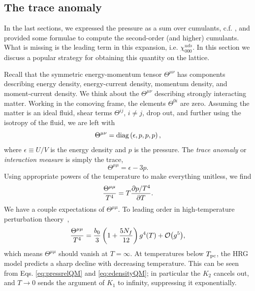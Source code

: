 \subsection{The trace anomaly}

In the last sections, we expressed the pressure as a sum over cumulants,
c.f. , and provided some formulae to compute the second-order 
(and higher) cumulants. What is missing is the leading term in this expansion,
i.e. $\chi^{uds}_{000}$. In this section we discuss a popular strategy for
obtaining this quantity on the lattice.

Recall that the symmetric energy-momentum 
tensor $\Theta^{\mu\nu}$ has components describing
energy density, energy-current density, momentum density, and moment-current
density. We think about the $\Theta^{\mu\nu}$ describing strongly interacting matter.
Working in the comoving frame, the elements $\Theta^{0i}$ are zero.
Assuming the matter is an ideal fluid, shear terms $\Theta^{ij}$, $i\neq j$, drop
out, and further using the isotropy of the fluid, we are left with 
\begin{equation}
\Theta^{\mu\nu}=\mathop{\mathrm{diag}}\left(\epsilon,p,p,p\right),
\end{equation}
where $\epsilon\equiv U/V$ is the energy density and $p$ is the pressure. 
The {\it trace anomaly} or {\it interaction
measure} is simply the trace,
\begin{equation}
\Theta^{\mu\mu}=\epsilon-3p.
\end{equation}
Using appropriate powers of the temperature to make everything unitless, we find
\begin{equation}\label{eq:thetaPressureDE}
\frac{\Theta^{\mu\mu}}{T^4}=T\pdv{p/T^4}{T}.
\end{equation}
We have a couple expectations of $\Theta^{\mu\mu}$. To leading order in
high-temperature perturbation theory~\cite{Kapusta:1979fh},
\begin{equation}
\frac{\Theta^{\mu\mu}}{T^4}=\frac{b_0}{3}\left(1+\frac{5N_f}{12}\right)g^4(T)+\order{g^5},
\end{equation}
which means $\Theta^{\mu\mu}$ should vanish at $T=\infty$. At temperatures below
$T_{\rm pc}$, the HRG model predicts a sharp decline with decreasing temperature. 
This can be seen from Eqs. \eqref{eq:pressrelQM} and \eqref{eq:edensityQM};
in particular the $K_2$ cancels out, and $T\to0$ sends the argument of $K_1$ to
infinity, suppressing it exponentially.

